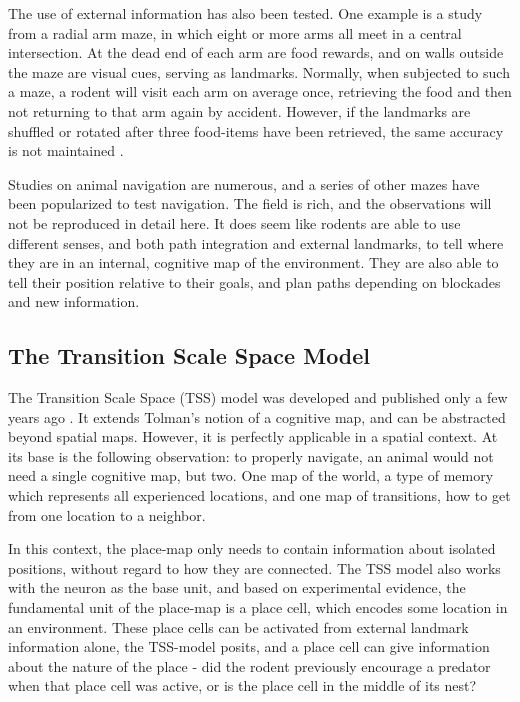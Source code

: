 \documentclass{article}
\begin{document}
    The use of external information has also been tested. One example is a study from a radial arm maze, in which eight or more arms all meet in a central intersection. At the dead end of each arm are food rewards, and on walls outside the maze are visual cues, serving as landmarks. Normally, when subjected to such a maze, a rodent will visit each arm on average once, retrieving the food and then not returning to that arm again by accident. However, if the landmarks are shuffled or rotated after three food-items have been retrieved, the same accuracy is not maintained \parencite{Suzuki1980}.

    Studies on animal navigation are numerous, and a series of other mazes have been popularized to test navigation. The field is rich, and the observations will not be reproduced in detail here. It does seem like rodents are able to use different senses, and both path integration and external landmarks, to tell where they are in an internal, cognitive map of the environment. They are also able to tell their position relative to their goals, and plan paths depending on blockades and new information.
    
    
    
    \subsection{The Transition Scale Space Model} \label{TSS}
    The Transition Scale Space (TSS) model was developed and published only a few years ago \parencite{Waniek2020}. It extends Tolman's notion of a cognitive map, and can be abstracted beyond spatial maps. However, it is perfectly applicable in a spatial context. At its base is the following observation: to properly navigate, an animal would not need a single cognitive map, but two. One map of the world, a type of memory which represents all experienced locations, and one map of transitions, how to get from one location to a neighbor.

    In this context, the place-map only needs to contain information about isolated positions, without regard to how they are connected. The TSS model also works with the neuron as the base unit, and based on experimental evidence, the fundamental unit of the place-map is a place cell, which encodes some location in an environment. These place cells can be activated from external landmark information alone, the TSS-model posits, and a place cell can give information about the nature of the place - did the rodent previously encourage a predator when that place cell was active, or is the place cell in the middle of its nest?
\end{document}
